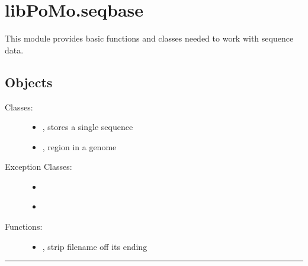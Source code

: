 \documentclass[letterpaper,10pt,english]{sphinxmanual}
\begin{document}
\label{seqbase:module-libPoMo.seqbase}

\section{libPoMo.seqbase}
\label{seqbase::doc}\label{seqbase:libpomo-seqbase}
This module provides basic functions and classes needed to work with
sequence data.


\subsection{Objects}
\label{seqbase:objects}\begin{description}
\item[{Classes:}] \leavevmode\begin{itemize}
\item {} 
{\hyperref[seqbase:libPoMo.seqbase.Seq]{}}, stores a single sequence

\item {} 
{\hyperref[seqbase:libPoMo.seqbase.Region]{}}, region in a genome

\end{itemize}

\item[{Exception Classes:}] \leavevmode\begin{itemize}
\item {} 
{\hyperref[seqbase:libPoMo.seqbase.SequenceDataError]{}}

\item {} 
{\hyperref[seqbase:libPoMo.seqbase.NotAValidRefBase]{}}

\end{itemize}

\item[{Functions:}] \leavevmode\begin{itemize}
\item {} 
{\hyperref[seqbase:libPoMo.seqbase.stripFName]{}}, strip filename off its ending

\end{itemize}

\end{description}


\bigskip\hrule{}\bigskip

\end{document}
